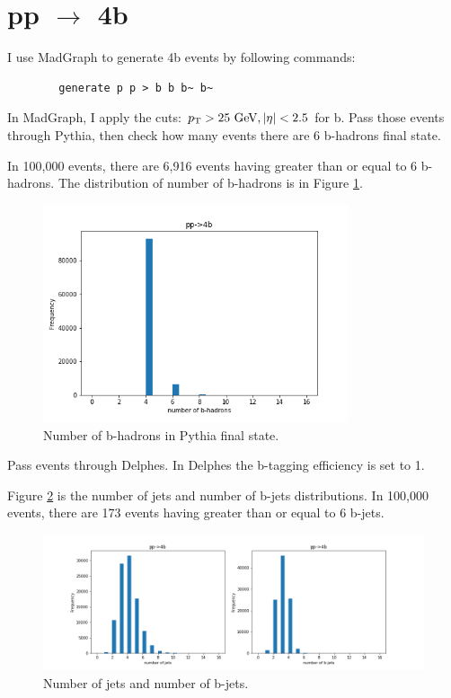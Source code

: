 \documentclass[12pt]{article}
\begin{document}
\section{\texorpdfstring{pp $\to $ 4b}{pp to 4b}}%
\label{sec:pp_4b}
	I use MadGraph to generate 4b events by following commands:
	\begin{verbatim}
		generate p p > b b b~ b~ 
	\end{verbatim}
	In MadGraph, I apply the cuts: $p_\text{T}>\text{25 GeV}, \abs{\eta}<2.5$ for b. Pass those events through Pythia, then check how many events there are 6 b-hadrons final state.

	In 100,000 events, there are 6,916 events having greater than or equal to 6 b-hadrons. The distribution of number of b-hadrons is in Figure \ref{fig:number_of_b_hadron}.
	\begin{figure}[htpb]
		\centering
		\includegraphics[width=0.8\textwidth]{number_of_b-hadrons.png}
		\caption{Number of b-hadrons in Pythia final state.}
		\label{fig:number_of_b_hadron}
	\end{figure}

	Pass events through Delphes. In Delphes the b-tagging efficiency is set to 1.

	Figure \ref{fig:number_of_jet} is the number of jets and number of b-jets distributions. In 100,000 events, there are 173 events having greater than or equal to 6 b-jets.
	\begin{figure}[htpb]
		\centering
		\includegraphics[width=1\textwidth]{number_of_b-jets.png}
		\caption{Number of jets and number of b-jets.}
		\label{fig:number_of_jet}
	\end{figure}
\end{document}
